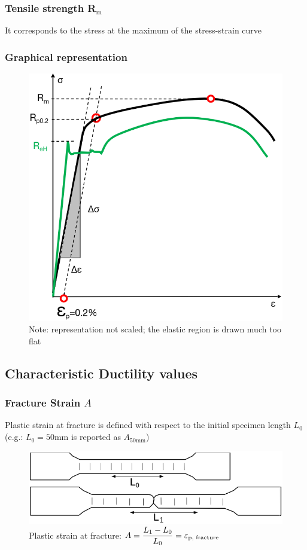 \documentclass{article}
\begin{document}
\subsubsection{Tensile strength R$_\text{m}$}
It corresponds to the stress at the maximum of the stress-strain curve

\newpage
\subsubsection{Graphical representation}
\begin{figure}[ht!]
  \centering
  \includegraphics[width=.5\textwidth]{media/stress-strain_graph.png}
  \caption*{Note: representation not scaled; the elastic region is drawn much too flat}
\end{figure}

\subsection{Characteristic Ductility values}
\subsubsection{Fracture Strain $A$}
Plastic strain at fracture is defined with respect to the initial specimen length $L_0$
(e.g.: $ L_0 = 50$mm is reported as $A_{50\text{mm}}$)

\begin{figure}[ht!]
  \centering
  \includegraphics[width=.7\textwidth]{media/plastic_strain_at_fracture.png}
  \caption*{Plastic strain at fracture: $\displaystyle A = \frac{L_1 - L_0}{L_0} = \varepsilon_{\text{p, fracture}}$}
\end{figure}
\end{document}
